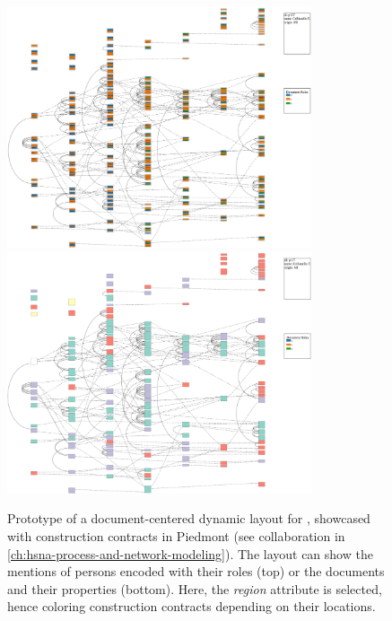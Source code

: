 \begin{figure}
    \centering
    \includegraphics[width=0.80\textwidth]{static/figures/conclusion/dyn_new}
    \includegraphics[width=0.80\textwidth]{static/figures/conclusion/dyn_new_region}
    \caption{Prototype of a document-centered dynamic layout for \modelplural, showcased with construction contracts in Piedmont (see collaboration \pascal in \autoref{ch:hsna-process-and-network-modeling}). The layout can show the mentions of persons encoded with their roles (top) or the documents and their properties (bottom). Here, the \emph{region} attribute is selected, hence coloring construction contracts depending on their locations.}
\label{fig:conclu-dynLayout}
\end{figure}

